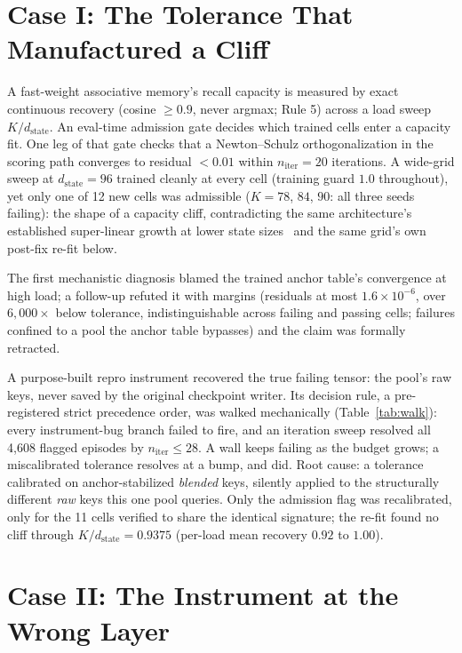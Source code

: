 \documentclass{article}
\newcommand{\dstate}{d_{\mathrm{state}}}
\newcommand{\niter}{n_{\mathrm{iter}}}
\begin{document}
\section{Case I: The Tolerance That Manufactured a Cliff}
\label{sec:tolerance}

A fast-weight associative memory's recall capacity is measured by
exact continuous recovery (cosine $\geq0.9$, never argmax; Rule 5)
across a load sweep $K/\dstate$. An eval-time admission gate decides
which trained cells enter a capacity fit. One leg of that gate checks
that a Newton--Schulz orthogonalization in the scoring path converges
to residual $<0.01$ within $\niter=20$ iterations. A wide-grid sweep at
$\dstate=96$ trained cleanly at every cell (training guard $1.0$
throughout), yet only one of 12 new cells was admissible
($K{=}78$, $84$, $90$: all three seeds
failing): the shape of a capacity cliff, contradicting the same
architecture's established super-linear growth at lower state
sizes~\citep{companion2026capacity} and the same grid's own post-fix
re-fit below.

The first mechanistic diagnosis blamed the trained anchor table's
convergence at high load; a follow-up refuted it with margins
(residuals at most $1.6\times10^{-6}$, over $6{,}000\times$ below
tolerance,
indistinguishable across failing and passing cells; failures confined
to a
pool the anchor table bypasses) and the claim was formally
retracted.

 A purpose-built repro instrument recovered the true failing
tensor: the pool's raw keys, never saved by the original checkpoint
writer. Its decision rule, a pre-registered strict precedence order,
was walked mechanically (Table~\ref{tab:walk}): every
instrument-bug branch failed to fire, and an iteration sweep resolved
all 4{,}608 flagged episodes by $\niter\le28$.
A wall keeps failing as the budget grows; a miscalibrated tolerance
resolves at a bump, and did. Root cause: a
tolerance calibrated on anchor-stabilized \emph{blended} keys,
silently applied to the structurally different \emph{raw} keys this
one pool queries. Only the admission flag was
recalibrated, only for the 11 cells verified to share the identical
signature; the re-fit found no cliff
through $K/\dstate=0.9375$ (per-load mean recovery $0.92$ to $1.00$).

\section{Case II: The Instrument at the Wrong Layer}
\label{sec:wronglayer}
\end{document}
